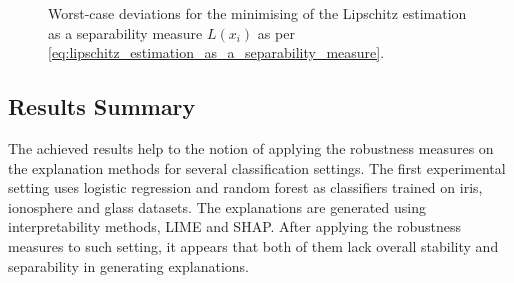 \documentclass[english]{tktltiki2}
\theoremstyle{definition}
\theoremstyle{remark}
\begin{document}
\begin{figure}[H]
	\vspace*{-5mm}
	\centering
	\qquad
	\qquad
	\qquad
	\qquad
	\caption{Worst-case deviations for the minimising of the Lipschitz estimation as a separability measure $L(x_i)$ as per \eqref{eq:lipschitz_estimation_as_a_separability_measure}.}%
	\label{fig:digit3_deviations_separability}%
\end{figure}





\subsection{Results Summary}\label{sec:results_summary} %
The achieved results help to the notion of applying the robustness measures on the explanation methods for several classification settings. The first experimental setting uses logistic regression and random forest as classifiers trained on iris, ionosphere and glass datasets. The explanations are generated using interpretability methods, LIME and SHAP. After applying the robustness measures to such setting, it appears that both of them lack overall stability and separability in generating explanations.
\end{document}
